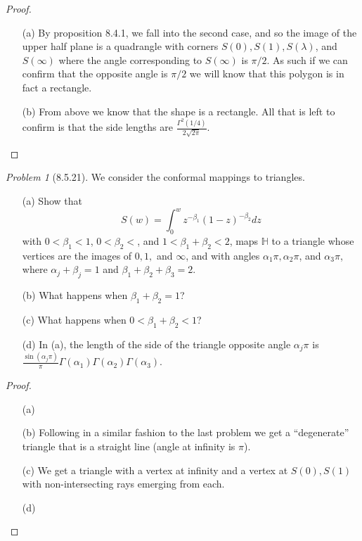 \documentclass[10pt]{article}
\newcommand{\sk}{\vskip 10mm}
\newcommand{\bb}[1]{\mathbb{#1}}
\theoremstyle{remark}
\newtheorem{problem}{Problem}
\theoremstyle{remark}
\begin{document}
\begin{proof}
  \begin{enumerate}
  \item[(a)] By proposition 8.4.1, we fall into the second case, and so the
    image of the upper half plane is a quadrangle with corners $S(0),S(1),S(\lambda)$, and
    $S(\infty)$ where the angle corresponding to $S(\infty)$ is $\pi/2$. As such if we can
    confirm that the opposite angle is $\pi/2$ we will know that this polygon is in fact
    a rectangle.
  \item[(b)] From above we know that the shape is a rectangle. All that is left
    to confirm is that the side lengths are $\frac{\Gamma^2(1/4)}{2\sqrt{2\pi}}$.
  \end{enumerate}
\end{proof}

\sk

\begin{problem}[8.5.21]
  We consider the conformal mappings to triangles.
  \begin{enumerate}
  \item[(a)] Show that
    \[
      S(w)=\int_0^w z^{-\beta_1}(1-z)^{-\beta_2}dz
    \]
    with $0<\beta_1<1$, $0<\beta_2<$, and $1<\beta_1+\beta_2<2$, maps $\bb{H}$
    to a triangle whose vertices are the images of $0,1,$ and
    $\infty$, and with angles $\alpha_1\pi,\alpha_2\pi$, and $\alpha_3\pi$,
    where $\alpha_j+\beta_j=1$ and $\beta_1+\beta_2+\beta_3=2$.
  \item[(b)] What happens when $\beta_1+\beta_2=1$?
  \item[(c)] What happens when $0<\beta_1+\beta_2<1$?
  \item[(d)] In (a), the length of the side of the triangle opposite angle
    $\alpha_j\pi$ is
    $\frac{\sin(\alpha_j\pi)}{\pi}\Gamma(\alpha_1)\Gamma(\alpha_2)\Gamma(\alpha_3)$.
  \end{enumerate}
\end{problem}

\begin{proof}
  \begin{enumerate}
  \item[(a)]
  \item[(b)] Following in a similar fashion to the last problem we
    get a ``degenerate'' triangle that is a straight line (angle at infinity is $\pi$).
  \item[(c)] We get a triangle with a vertex at infinity and a vertex at $S(0),S(1)$ with
    non-intersecting rays emerging from each.
  \item[(d)]
  \end{enumerate}
\end{proof}
\end{document}
